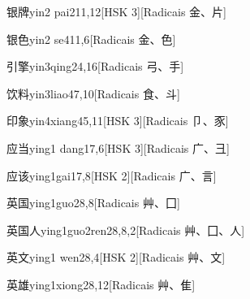 \begin{entry}{银牌}{yin2 pai2}{11,12}[HSK 3][Radicais ⾦、⽚]
\end{entry}

\begin{entry}{银色}{yin2 se4}{11,6}[Radicais ⾦、⾊]
\end{entry}

\begin{entry}{引擎}{yin3qing2}{4,16}[Radicais ⼸、⼿]
\end{entry}

\begin{entry}{饮料}{yin3liao4}{7,10}[Radicais ⾷、⽃]
\end{entry}

\begin{entry}{印象}{yin4xiang4}{5,11}[HSK 3][Radicais ⼙、⾗]
\end{entry}

\begin{entry}{应当}{ying1 dang1}{7,6}[HSK 3][Radicais ⼴、⼹]
\end{entry}

\begin{entry}{应该}{ying1gai1}{7,8}[HSK 2][Radicais ⼴、⾔]
\end{entry}

\begin{entry}{英国}{ying1guo2}{8,8}[Radicais ⾋、⼞]
\end{entry}

\begin{entry}{英国人}{ying1guo2ren2}{8,8,2}[Radicais ⾋、⼞、⼈]
\end{entry}

\begin{entry}{英文}{ying1 wen2}{8,4}[HSK 2][Radicais ⾋、⽂]
\end{entry}

\begin{entry}{英雄}{ying1xiong2}{8,12}[Radicais ⾋、⾫]
\end{entry}


